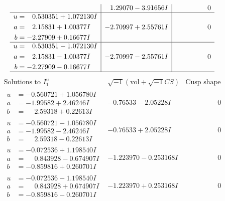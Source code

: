 \documentclass[1p]{elsarticle_modified}
\theoremstyle{definition}
\newcommand{\I}{\sqrt{-1}}
\begin{document}
$$\begin{array}{c|c|c}
 & \phantom{-}1.29070 - 3.91656 I & \phantom{-0.000000 } 0 \\ \hline\begin{aligned}
u &= \phantom{-}0.530351 + 1.072130 I \\
a &= \phantom{-}2.15831 + 1.00377 I \\
b &= -2.27909 + 0.16677 I\end{aligned}
 & -2.70997 + 2.55761 I & \phantom{-0.000000 } 0 \\ \hline\begin{aligned}
u &= \phantom{-}0.530351 - 1.072130 I \\
a &= \phantom{-}2.15831 - 1.00377 I \\
b &= -2.27909 - 0.16677 I\end{aligned}
 & -2.70997 - 2.55761 I & \phantom{-0.000000 } 0\\
 \hline 
 \end{array}$$\newpage$$\begin{array}{c|c|c}  
\text{Solutions to }I^u_{1}& \I (\text{vol} + \sqrt{-1}CS) & \text{Cusp shape}\\
 \hline 
\begin{aligned}
u &= -0.560721 + 1.056780 I \\
a &= -1.99582 + 2.46246 I \\
b &= \phantom{-}2.59318 + 0.22613 I\end{aligned}
 & -0.76533 - 2.05228 I & \phantom{-0.000000 } 0 \\ \hline\begin{aligned}
u &= -0.560721 - 1.056780 I \\
a &= -1.99582 - 2.46246 I \\
b &= \phantom{-}2.59318 - 0.22613 I\end{aligned}
 & -0.76533 + 2.05228 I & \phantom{-0.000000 } 0 \\ \hline\begin{aligned}
u &= -0.072536 + 1.198540 I \\
a &= \phantom{-}0.843928 - 0.674907 I \\
b &= -0.859816 + 0.260701 I\end{aligned}
 & -1.223970 - 0.253168 I & \phantom{-0.000000 } 0 \\ \hline\begin{aligned}
u &= -0.072536 - 1.198540 I \\
a &= \phantom{-}0.843928 + 0.674907 I \\
b &= -0.859816 - 0.260701 I\end{aligned}
 & -1.223970 + 0.253168 I & \phantom{-0.000000 } 0 \\ \hline\begin{aligned}

\end{aligned}
\end{array}$$
\end{document}
